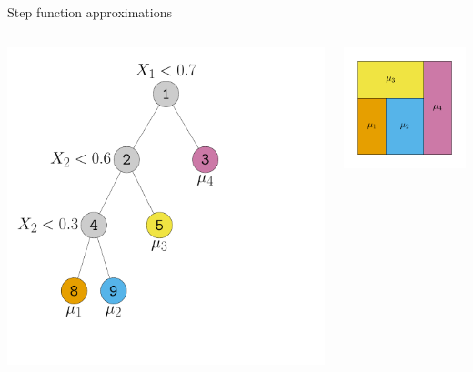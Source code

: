 \documentclass[aspectratio=199]{beamer}
\begin{document}
\begin{frame}{Step function approximations}

\begin{columns}
\centering
\begin{column}{0.25\textwidth}
\centering
\includegraphics[width = \textwidth]{figures/old_decision_rule}
\end{column}
\begin{column}{0.25\textwidth}
\centering
\includegraphics[width = \textwidth]{figures/old_partition}

\end{column}
\end{columns}
\end{frame}
\end{document}
